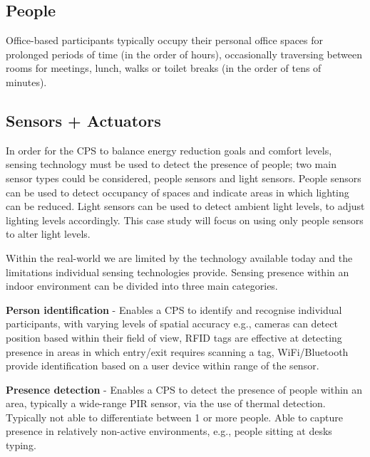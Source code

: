 \subsection{People}
\label{subsec:People}
Office-based participants typically occupy their personal office spaces for prolonged periods of time (in the order of hours), occasionally traversing between rooms for meetings, lunch, walks or toilet breaks (in the order of tens of minutes).


\subsection{Sensors + Actuators}
\label{subsec:Sensors + Actuators}

In order for the CPS to balance energy reduction goals and comfort levels, sensing technology must be used to detect the presence of people; two main sensor types could be considered, people sensors and light sensors. People sensors can be used to detect occupancy of spaces and indicate areas in which lighting can be reduced. Light sensors can be used to detect ambient light levels, to adjust lighting levels accordingly. This case study will focus on using only people sensors to alter light levels.

Within the real-world we are limited by the technology available today and the limitations individual sensing technologies provide. Sensing presence within an indoor environment can be divided into three main categories.


\textbf{Person identification} - Enables a CPS to identify and recognise individual participants, with varying levels of spatial accuracy e.g., cameras can detect position based within their field of view, RFID tags are effective at detecting presence in areas in which entry/exit requires scanning a tag, WiFi/Bluetooth provide identification based on a user device within range of the sensor.

\textbf{Presence detection} - Enables a CPS to detect the presence of people within an area, typically a wide-range PIR sensor, via the use of thermal detection. Typically not able to differentiate between 1 or more people. Able to capture presence in relatively non-active environments, e.g., people sitting at desks typing.

